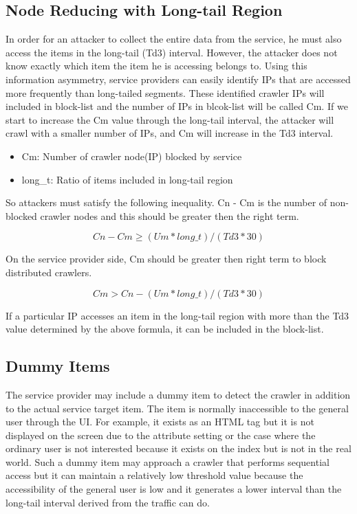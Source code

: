 \documentclass[sigconf,anonymous=false]{acmart}
\begin{document}
\subsection{Node Reducing with Long-tail Region}
In order for an attacker to collect the entire data from the service, he must also access the items in the long-tail (Td3) interval. However, the attacker does not know exactly which item the item he is accessing belongs to. Using this information asymmetry, service providers can easily identify IPs that are accessed more frequently than long-tailed segments. These identified crawler IPs will included in block-list and the number of IPs in blcok-list will be called Cm. If we start to increase the Cm value through the long-tail interval, the attacker will crawl with a smaller number of IPs, and Cm will increase in the Td3 interval.

\begin{itemize}
\item Cm: Number of crawler node(IP) blocked by service
\item long\_t: Ratio of items included in long-tail region
\end{itemize}

So attackers must satisfy the following inequality. Cn - Cm is the number of non-blocked crawler nodes and this should be greater then the right term.

  \begin{displaymath}
Cn - Cm \geq (Um * long\_t) / (Td3 * 30)
  \end{displaymath}\newline

On the service provider side, Cm should be greater then right term to block distributed crawlers.

  \begin{displaymath}
Cm > Cn - (Um * long\_t) / (Td3 * 30)
  \end{displaymath}\newline

If a particular IP accesses an item in the long-tail region with more than the Td3 value determined by the above formula, it can be included in the block-list.


\subsection{Dummy Items}
The service provider may include a dummy item to detect the crawler in addition to the actual service target item. The item is normally inaccessible to the general user through the UI. For example, it exists as an HTML tag but it is not displayed on the screen due to the attribute setting or the case where the ordinary user is not interested because it exists on the index but is not in the real world.
Such a dummy item may approach a crawler that performs sequential access but it can maintain a relatively low threshold value because the accessibility of the general user is low and it generates a lower interval than the long-tail interval derived from the traffic can do.
\end{document}
